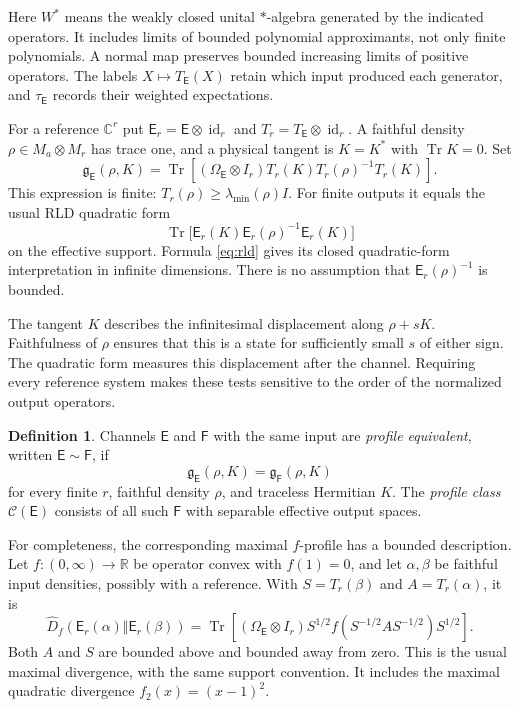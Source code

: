 \documentclass[11pt,reqno]{amsart}
\theoremstyle{definition}
\newtheorem{definition}[theorem]{Definition}
\theoremstyle{remark}
\numberwithin{equation}{section}
\DeclareMathOperator{\Tr}{Tr}
\DeclareMathOperator{\id}{id}
\newcommand{\C}{\mathcal C}
\newcommand{\E}{\mathsf E}
\newcommand{\F}{\mathsf F}
\newcommand{\rld}{\mathfrak g}
\newcommand{\maxdiv}{\widehat D}
\begin{document}
Here $W^*$ means the weakly closed unital $*$-algebra generated by the indicated operators. It includes limits of bounded polynomial approximants, not only finite polynomials. A normal map preserves bounded increasing limits of positive operators. The labels $X\mapsto T_\E(X)$ retain which input produced each generator, and $\tau_\E$ records their weighted expectations.

For a reference $\mathbb C^r$ put $\E_r=\E\otimes\id_r$ and $T_r=T_\E\otimes\id_r$. A faithful density $\rho\in M_a\otimes M_r$ has trace one, and a physical tangent is $K=K^*$ with $\Tr K=0$. Set
\begin{equation}\label{eq:rld}
 \rld_\E(\rho,K)
 =\Tr\!\left[(\Omega_\E\otimes I_r)
 T_r(K)T_r(\rho)^{-1}T_r(K)\right].
\end{equation}
This expression is finite: $T_r(\rho)\ge\lambda_{\min}(\rho)I$. For finite outputs it equals the usual RLD quadratic form
\[
 \Tr\bigl[\E_r(K)\E_r(\rho)^{-1}\E_r(K)\bigr]
\]
on the effective support. Formula \eqref{eq:rld} gives its closed quadratic-form interpretation in infinite dimensions. There is no assumption that $\E_r(\rho)^{-1}$ is bounded.

The tangent $K$ describes the infinitesimal displacement along $\rho+sK$. Faithfulness of $\rho$ ensures that this is a state for sufficiently small $s$ of either sign. The quadratic form measures this displacement after the channel. Requiring every reference system makes these tests sensitive to the order of the normalized output operators.

\begin{definition}
Channels $\E$ and $\F$ with the same input are \emph{profile equivalent}, written $\E\sim\F$, if
\[
 \rld_\E(\rho,K)=\rld_\F(\rho,K)
\]
for every finite $r$, faithful density $\rho$, and traceless Hermitian $K$. The \emph{profile class} $\C(\E)$ consists of all such $\F$ with separable effective output spaces.
\end{definition}

For completeness, the corresponding maximal $f$-profile has a bounded description. Let $f:(0,\infty)\to\mathbb R$ be operator convex with $f(1)=0$, and let $\alpha,\beta$ be faithful input densities, possibly with a reference. With $S=T_r(\beta)$ and $A=T_r(\alpha)$, it is
\begin{equation}\label{eq:maxf}
 \maxdiv_f(\E_r(\alpha)\Vert\E_r(\beta))
 =\Tr\!\left[(\Omega_\E\otimes I_r)
 S^{1/2}f(S^{-1/2}AS^{-1/2})S^{1/2}\right].
\end{equation}
Both $A$ and $S$ are bounded above and bounded away from zero. This is the usual maximal divergence, with the same support convention. It includes the maximal quadratic divergence $f_2(x)=(x-1)^2$.
\end{document}
